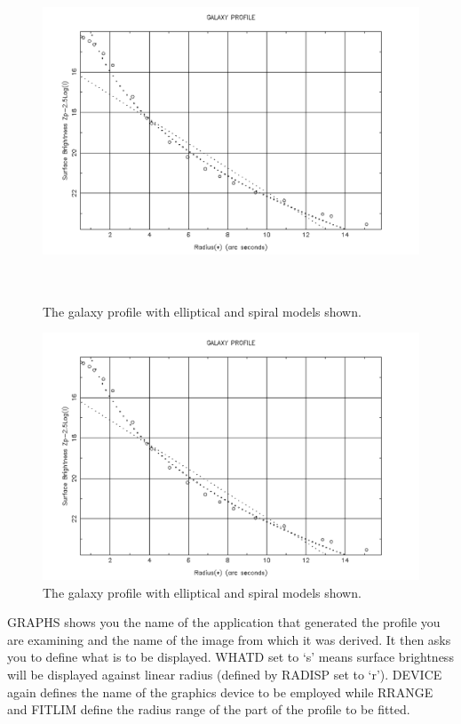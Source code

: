 \documentclass[twoside,11pt]{article}
\newenvironment{latexonly}{}{}
\begin{document}
\begin{latexonly}
\begin{figure}[htlb]
\centering
\includegraphics[height=100mm,width=150mm]{sun180_diag5}
\caption{The galaxy profile with elliptical and spiral models shown.}
\end{figure}
\end{latexonly}
\begin{htmlonly}
\begin{figure}[htlb]
\centering
\includegraphics{sun180_diag5}
\caption{The galaxy profile with elliptical and spiral models shown.}
\end{figure}
\end{htmlonly}

GRAPHS shows you the name of the application that generated the
profile you are examining and the name of the image from which
it was derived. It then asks you to define what is to be displayed.
WHATD set to `s' means surface brightness will be displayed against
linear radius (defined by RADISP set to `r'). DEVICE again defines the
name of the graphics device to be employed while RRANGE and FITLIM define the
radius range of the part of the profile to be fitted.
\end{document}
